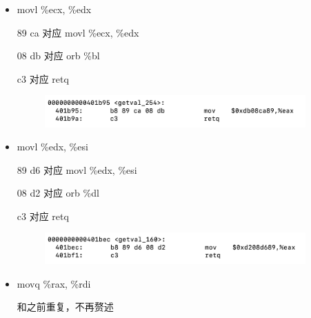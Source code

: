 \begin{itemize}
\begin{figure}[htbp]
        \end{figure}
        \item movl \%ecx, \%edx
        \par 89 ca 对应 movl \%ecx, \%edx
        \par 08 db 对应 orb \%bl
        \par c3 对应 retq
        \begin{figure}[htbp]
            \centering
            \includegraphics*[width = 10cm]{ecx_edx.png}
        \end{figure}
        \item movl \%edx, \%esi
        \par 89 d6 对应 movl \%edx, \%esi
        \par 08 d2 对应 orb  \%dl
        \par c3 对应 retq
        \begin{figure}[htbp]
            \centering
            \includegraphics*[width = 10cm]{edx_esi.png}
        \end{figure}
        \item movq \%rax, \%rdi
        \par 和之前重复，不再赘述
    \end{itemize}